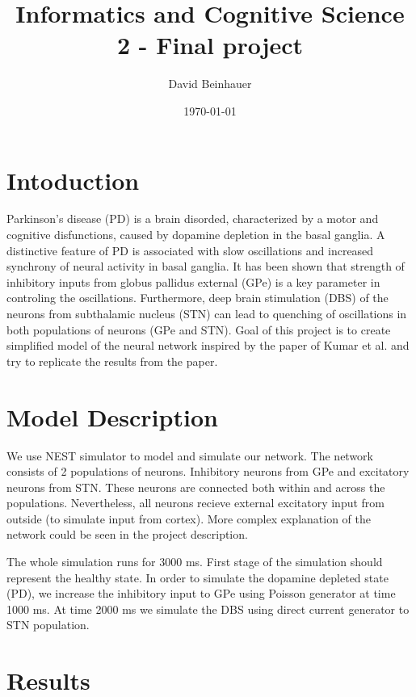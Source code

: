 \documentclass[11pt]{article}
\title{ Informatics and Cognitive Science 2 - Final project}
\author{ David Beinhauer }
\date{\today}
\begin{document}
\maketitle



\section{Intoduction}
Parkinson's disease (PD) is a brain disorded, characterized by a motor and cognitive
disfunctions, caused by dopamine depletion in the basal ganglia. A distinctive feature of
PD is associated with slow oscillations and increased synchrony of neural activity 
in basal ganglia. It has been shown that strength of inhibitory inputs from globus 
pallidus external (GPe) is a key parameter in controling the oscillations. Furthermore,
deep brain stimulation (DBS) of the neurons from subthalamic nucleus (STN) can lead to 
quenching of oscillations in both populations of neurons (GPe and STN). Goal of this 
project is to create simplified model of the neural network inspired by the paper of 
Kumar et al. and try to replicate the results from the paper.



\section{Model Description}
We use NEST simulator to model and simulate our network. The network consists of 
2 populations of neurons. Inhibitory neurons from GPe and excitatory neurons from STN. 
These neurons are connected both within and across the populations. Nevertheless,
all neurons recieve external excitatory input from outside (to simulate input from 
cortex). More complex explanation of the network could be seen in the project description.

The whole simulation runs for 3000 ms. First stage of the simulation should represent the
healthy state. In order to simulate the dopamine depleted state (PD), 
we increase the inhibitory input to GPe using Poisson generator at time 1000 ms.
At time 2000 ms we simulate the DBS using direct current generator to STN population.



\section{Results}
\end{document}
